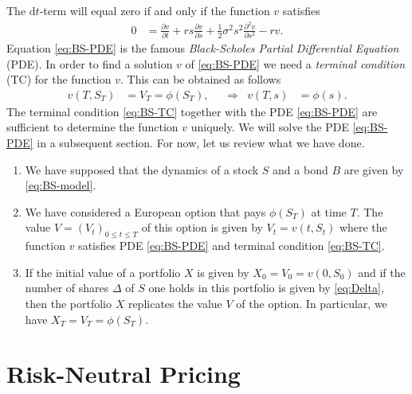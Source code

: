 \documentclass[12pt]{book}
\numberwithin{equation}{chapter}
\theoremstyle{plain}
\numberwithin{theorem}{section}
\theoremstyle{definition}
\numberwithin{exercise}{chapter}
\newcommand{\<}{\langle}
\renewcommand{\>}{\rangle}
\renewcommand{\(}{\left(}
\renewcommand{\)}{\right)}
\renewcommand{\[}{\left[}
\renewcommand{\]}{\right]}
\newcommand\Del{\Delta}
\renewcommand\d{\partial}
\newcommand\dd{\mathrm{d}}
\theoremstyle{definition}
\numberwithin{question}{section}
\begin{document}
The $\dd t$-term will equal zero if and only if the function $v$ satisfies 
\begin{align}
0
	&=	\frac{\d v}{\d t} + r s \frac{\d v}{\d s} + \frac{1}{2} \sigma^2 s^2 \frac{\d^2 v}{\d s^2} - r v . \label{eq:BS-PDE}
\end{align}
Equation \eqref{eq:BS-PDE} is the famous \textit{Black-Scholes Partial Differential Equation} (PDE).  In order to find a solution $v$ of \eqref{eq:BS-PDE} we need a \textit{terminal condition} (TC) for the function $v$.  This can be obtained as follows
\begin{align}
v(T,S_T)
	&=	V_T = \phi(S_T) , &
	&\Rightarrow&
v(T,s)
	&=	\phi(s) . \label{eq:BS-TC}
\end{align}
The terminal condition \eqref{eq:BS-TC} together with the PDE \eqref{eq:BS-PDE} are sufficient to determine the function $v$ uniquely.  We will solve the PDE \eqref{eq:BS-PDE} in a subsequent section.  For now, let us review what we have done.
\begin{enumerate}
\item We have supposed that the dynamics of a stock $S$ and a bond $B$ are given by \eqref{eq:BS-model}.
\item We have considered a European option that pays $\phi(S_T)$ at time $T$.  The value $V = (V_t)_{0 \leq t \leq T}$ of this option is given by $V_t = v(t,S_t)$ where the function $v$ satisfies PDE \eqref{eq:BS-PDE} and terminal condition \eqref{eq:BS-TC}.
\item If the initial value of a portfolio $X$ is given by $X_0 = V_0 = v(0,S_0)$ and if the number of shares  $\Del$ of $S$ one holds in this portfolio is given by \eqref{eq:Delta}, then the portfolio $X$ replicates the value $V$ of the option.  In particular, we have $X_T = V_T = \phi(S_T)$. 
\end{enumerate}

\section{Risk-Neutral Pricing}
\end{document}
